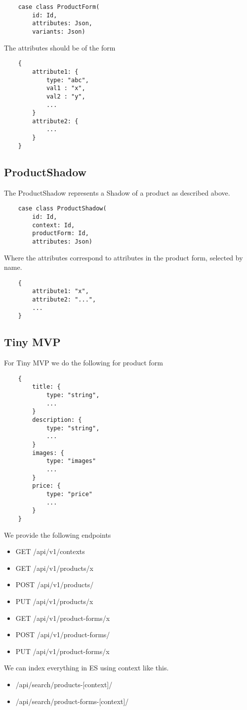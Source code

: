 \documentclass[11pt]{article}
\begin{document}
\begin{lstlisting}
    case class ProductForm(
        id: Id,
        attributes: Json,
        variants: Json)
\end{lstlisting}

The attributes should be of the form
\begin{lstlisting}
    {
        attribute1: {
            type: "abc",
            val1 : "x",
            val2 : "y",
            ...
        }
        attribute2: {
            ...
        }
    }
\end{lstlisting}


\subsection{ProductShadow}

The ProductShadow represents a Shadow of a product as described above. 

\begin{lstlisting}
    case class ProductShadow(
        id: Id,
        context: Id,
        productForm: Id,
        attributes: Json)
\end{lstlisting}

Where the attributes correspond to attributes in the product form, selected by
name.

\begin{lstlisting}
    {
        attribute1: "x",
        attribute2: "...",
        ...
    }
\end{lstlisting}

\newpage
\subsection{Tiny MVP}

For Tiny MVP we do the following for product form
\begin{lstlisting}
    {
        title: { 
            type: "string",
            ...
        }
        description: { 
            type: "string",
            ...  
        }
        images: { 
            type: "images"
            ...  
        }
        price: {
            type: "price"
            ...
        }
    }
\end{lstlisting}
\newpage

We provide the following endpoints

\begin{itemize}
    \item GET /api/v1/contexts
    \item GET /api/v1/products/x
    \item POST /api/v1/products/
    \item PUT /api/v1/products/x
    \item GET /api/v1/product-forms/x
    \item POST /api/v1/product-forms/
    \item PUT /api/v1/product-forms/x
\end{itemize}

We can index everything in ES using context like this.

\begin{itemize}
    \item /api/search/products-[context]/
    \item /api/search/product-forms-[context]/
\end{itemize}
\end{document}
